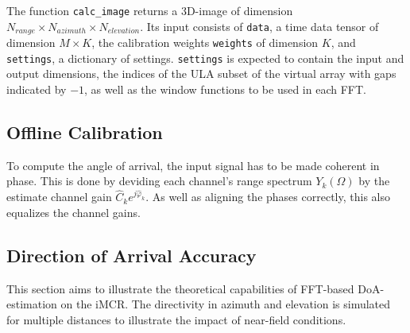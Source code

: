 The function \verb|calc_image| returns a 3D-image of dimension $N_{range} \times N_{azimuth} \times N_{elevation}$.
Its input consists of \verb|data|, a time data tensor of dimension $M \times K$,
the calibration weights \verb|weights| of dimension $K$, and \verb|settings|, a dictionary of settings.
\verb|settings| is expected to contain the input and output dimensions,
the indices of the ULA subset of the virtual array with gaps indicated by $-1$,
as well as the window functions to be used in each FFT.

\subsection{Offline Calibration}
To compute the angle of arrival, the input signal has to be made coherent in phase.
This is done by deviding each channel's range spectrum $Y_k(\Omega)$ by the estimate channel gain $\hat C_k e^{j\hat \varphi_k}$.
As well as aligning the phases correctly, this also equalizes the channel gains. \\

\subsection{Direction of Arrival Accuracy}
\label{ssec:fft_doa}
This section aims to illustrate the theoretical capabilities of FFT-based DoA-estimation on the iMCR.
The directivity in azimuth and elevation is simulated for multiple distances to illustrate the impact of near-field conditions.
\\


